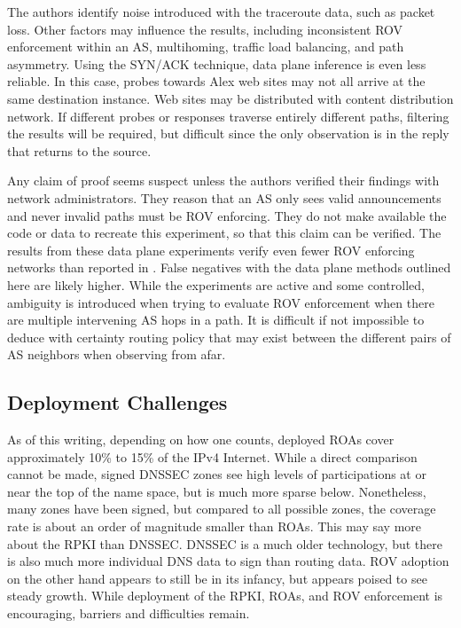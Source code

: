 \documentclass[sigconf]{acmart}
\begin{document}
The authors identify noise introduced with the traceroute data, such as
packet loss.  Other factors may influence the results, including
inconsistent ROV enforcement within an AS, multihoming, traffic load
balancing, and path asymmetry.  Using the SYN/ACK technique, data plane
inference is even less reliable.  In this case, probes towards Alex web
sites may not all arrive at the same destination instance.  Web sites
may be distributed with content distribution network.  If different
probes or responses traverse entirely different paths, filtering the
results will be required, but difficult since the only observation is in
the reply that returns to the source.

Any claim of proof seems suspect unless the authors verified their
findings with network administrators.  They reason that an AS only sees
valid announcements and never invalid paths must be ROV enforcing.  They
do not make available the code or data to recreate this experiment, so
that this claim can be verified.  The results from these data plane
experiments verify even fewer ROV enforcing networks than reported in
\cite{reuter_towards_2018}.  False negatives with the data plane methods
outlined here are likely higher.  While the experiments are active and
some controlled, ambiguity is introduced when trying to evaluate ROV
enforcement when there are multiple intervening AS hops in a path.  It
is difficult if not impossible to deduce with certainty routing policy
that may exist between the different pairs of AS neighbors when
observing from afar.

\subsection{Deployment Challenges}

As of this writing, depending on how one counts, deployed ROAs cover
approximately 10\% to 15\% of the IPv4 Internet.  While a direct
comparison cannot be made, signed DNSSEC zones see high levels of
participations at or near the top of the name space, but is much more
sparse below.  Nonetheless, many zones have been signed, but compared to
all possible zones, the coverage rate is about an order of magnitude
smaller than ROAs.  This may say more about the RPKI than DNSSEC.
DNSSEC is a much older technology, but there is also much more
individual DNS data to sign than routing data.  ROV adoption on the
other hand appears to still be in its infancy, but appears poised to
see steady growth.  While deployment of the RPKI, ROAs, and ROV
enforcement is encouraging, barriers and difficulties remain.
\end{document}
